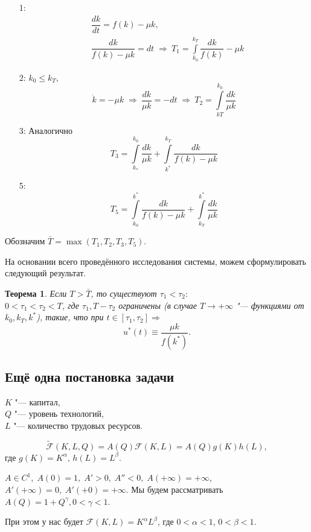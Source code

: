 \documentclass[12pt, a4paper]{article}
\theoremstyle{rusdef}
\newtheorem{theorem}{Теорема}
\DeclareMathOperator*{\thus}{\Rightarrow} %
\begin{document}
\begin{enumerate}
  \item[1:] 
  \begin{align*}
    &\dfrac{dk}{dt} = f(k) - \mu k, \\
    &\dfrac{dk}{f(k) - \mu k} = dt \;\thus\: T_1 = \int\limits_{k_0}^{k_T} \dfrac{dk}{f(k)} - \mu k
  \end{align*}
  \item[2:] $k_0 \leqslant k_T$,
  \[
    \dot{k} = - \mu k \;\thus\: \dfrac{dk}{\mu k} = -dt \;\thus\: T_2 = \int\limits_{kT}^{k_0} \dfrac{dk}{\mu k}
  \]
  \item[3:] Аналогично
  \[
    T_3 = \int\limits_{k_*}^{k_0}\dfrac{dk}{\mu k} + \int\limits_{k^*}^{k_T} \dfrac{dk}{f(k) - \mu k}
  \]
  \item[5:]
  \[
    T_5 = \int\limits_{k_0}^{k^*} \dfrac{dk}{f(k) - \mu k} + \int\limits_{k_T}^{k^*}\dfrac{dk}{\mu k}
  \]  
\end{enumerate}
Обозначим $\bar{T} = \max(T_1, T_2, T_3, T_5)$.

На основании всего проведённого исследования системы, можем сформулировать следующий результат.
\begin{theorem}
  Если $T > \bar{T}$, то существуют $\tau_1 < \tau_2 \colon$ \\ $0 <\tau_1 < \tau_2 < T$, где $\tau_1, {T - \tau_2}$ ограничены (в случае $T \to +\infty$ "--- функциями от $k_0, k_T, k^*$), такие, что при $t \in [\tau_1, \tau_2] \thus$
  \[
    u^*(t) \equiv \dfrac{\mu k}{f(k^*)}.
  \]
\end{theorem}


\subsection*{Ещё одна постановка задачи}
$K$ "--- капитал,\\
$Q$ "--- уровень технологий,\\
$L$ "--- количество трудовых ресурсов.

\[
  \tilde{\mathcal{F}}(K, L, Q) = A(Q) \mathcal{F}(K, L) = A(Q) g(K) h(L),
\]
где $g(K) = K^{\alpha}$, $h(L) = L^{\beta}$.

$A \in C^1, \; A(0) = 1,\; A' > 0,\; A'' < 0,\; A(+\infty) = +\infty$,\\ $A'(+\infty) = 0,\; A'(+0) = +\infty$.
Мы будем рассматривать\\ $A(Q) = 1 + Q^{\gamma}, 0 < \gamma < 1$.

При этом у нас будет $\mathcal{F}(K, L) = K^{\alpha}L^{\beta}$, где $0 < \alpha < 1$, $0 < \beta < 1$.
\end{document}
